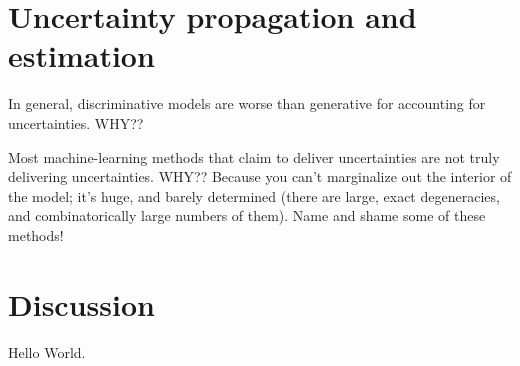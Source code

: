 \documentclass[modern]{aastex631}
\begin{document}
\section{Uncertainty propagation and estimation}

In general, discriminative models are worse than generative for accounting for uncertainties. WHY??

Most machine-learning methods that claim to deliver uncertainties are not truly delivering uncertainties. WHY?? Because you can't marginalize out the interior of the model; it's huge, and barely determined (there are large, exact degeneracies, and combinatorically large numbers of them).
Name and shame some of these methods!

\section{Discussion}

Hello World.

{}

\end{document}
